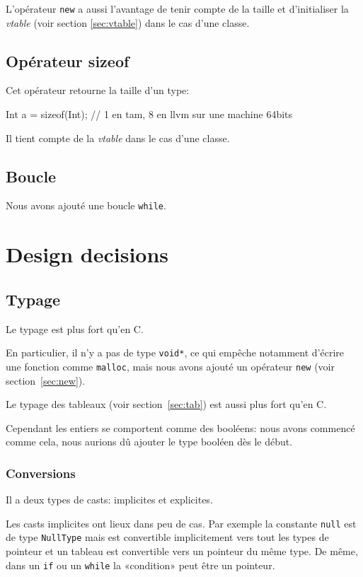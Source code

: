 \documentclass{scrartcl}
\begin{document}
    L'opérateur \verb+new+ a aussi l'avantage de tenir compte de la taille et
    d'initialiser la \textit{vtable} (voir section \ref{sec:vtable}) dans le
    cas d'une classe.

  \subsection{Opérateur sizeof}
    Cet opérateur retourne la taille d'un type:

    \begin{moccode}
Int a = sizeof(Int); // 1 en tam, 8 en llvm sur une machine 64bits
    \end{moccode}

    Il tient compte de la \textit{vtable} dans le cas d'une classe.

  \subsection{Boucle}
    Nous avons ajouté une boucle \verb+while+.

\section{Design decisions}
  \subsection{Typage}
    Le typage est plus fort qu'en C.

    En particulier, il n'y a pas de type \verb+void*+, ce qui empêche notamment
    d'écrire une fonction comme \verb+malloc+, mais nous avons ajouté un
    opérateur \verb+new+ (voir section~\ref{sec:new}).

    Le typage des tableaux (voir section~\ref{sec:tab}) est aussi plus fort qu'en C.

    Cependant les entiers se comportent comme des booléens: nous avons commencé
    comme cela, nous aurions dû ajouter le type booléen dès le début.

    \subsubsection{Conversions}
      Il a deux types de casts: implicites et explicites.

      Les casts implicites ont lieux dans peu de cas. Par exemple la constante
      \verb+null+ est de type \verb+NullType+ mais est convertible
      implicitement vers tout les types de pointeur et un tableau est
      convertible vers un pointeur du même type. De même, dans un \verb+if+ ou
      un \verb+while+ la «condition» peut être un pointeur.
\end{document}
